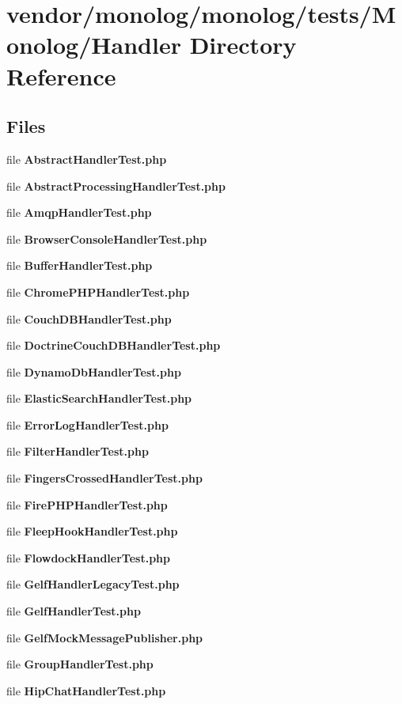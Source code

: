 \section{vendor/monolog/monolog/tests/\+Monolog/\+Handler Directory Reference}
\label{dir_d08fcbdfde3de4b7cc5cb071c8053043}
\subsection*{Files}
\begin{DoxyCompactItemize}
\item 
file {\bf Abstract\+Handler\+Test.\+php}
\item 
file {\bf Abstract\+Processing\+Handler\+Test.\+php}
\item 
file {\bf Amqp\+Handler\+Test.\+php}
\item 
file {\bf Browser\+Console\+Handler\+Test.\+php}
\item 
file {\bf Buffer\+Handler\+Test.\+php}
\item 
file {\bf Chrome\+P\+H\+P\+Handler\+Test.\+php}
\item 
file {\bf Couch\+D\+B\+Handler\+Test.\+php}
\item 
file {\bf Doctrine\+Couch\+D\+B\+Handler\+Test.\+php}
\item 
file {\bf Dynamo\+Db\+Handler\+Test.\+php}
\item 
file {\bf Elastic\+Search\+Handler\+Test.\+php}
\item 
file {\bf Error\+Log\+Handler\+Test.\+php}
\item 
file {\bf Filter\+Handler\+Test.\+php}
\item 
file {\bf Fingers\+Crossed\+Handler\+Test.\+php}
\item 
file {\bf Fire\+P\+H\+P\+Handler\+Test.\+php}
\item 
file {\bf Fleep\+Hook\+Handler\+Test.\+php}
\item 
file {\bf Flowdock\+Handler\+Test.\+php}
\item 
file {\bf Gelf\+Handler\+Legacy\+Test.\+php}
\item 
file {\bf Gelf\+Handler\+Test.\+php}
\item 
file {\bf Gelf\+Mock\+Message\+Publisher.\+php}
\item 
file {\bf Group\+Handler\+Test.\+php}
\item 
file {\bf Hip\+Chat\+Handler\+Test.\+php}
\item 

\end{DoxyCompactItemize}
